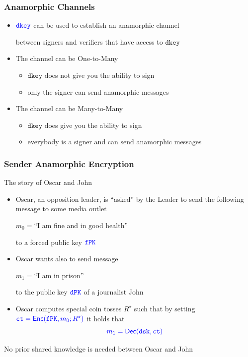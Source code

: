 \documentclass[]{beamer}
\newcommand{\algofont}[1]{{\mathsf{#1}}}
\newcommand{\objfont}[1]{{\mathtt{#1}}}
\newcommand{\enc}{\algofont{Enc}}
\newcommand{\dec}{\algofont{Dec}}
\newcommand{\ct}{\objfont{ct}}      %
\newcommand{\pk}{\objfont{PK}}      %
\newcommand{\fpk}{\objfont{f}\pk}   %
\newcommand{\dpk}{\objfont{d}\pk}   %
\newcommand{\sk}{\objfont{sk}}      %
\newcommand{\dsk}{\objfont{d}\sk}   %
\newcommand{\dkey}{\objfont{dkey}}  %
\begin{document}
\begin{frame}

\frametitle{Anamorphic Channels}

\begin{itemize}

\item $\color{blue} \dkey$ can be used to establish an {\color{purple} anamorphic channel}

    between signers and verifiers that have access to $\dkey$

\vfill

\item The channel can be \color{purple}  One-to-Many
        \begin{itemize}
            \item \color{brown} $\dkey$ does not give you the ability to sign
            \item \color{teal} only the signer can send anamorphic messages
        \end{itemize}

\vfill
\item \color{black}
The channel can be \color{purple}  Many-to-Many
        \begin{itemize}
            \item \color{brown} $\dkey$ does give you the ability to sign
            \item \color{teal} everybody is a signer and can send anamorphic
                messages
        \end{itemize}
\end{itemize}
\end{frame}


\begin{frame}
\frametitle{Sender Anamorphic Encryption}
\begin{block}{The story of Oscar and John}
\begin{itemize}[<+->]
\item {\color{green} Oscar}, an opposition leader, is ``asked'' by 
the Leader to send the following message to some media outlet

    \centerline{\color{purple} $m_0=$``I am fine and in good health''}

    to a {\color{purple} forced} public key $\color{blue} \fpk$

\item {\color{green} Oscar} wants also to send message 

\centerline{\color{purple} $m_1=$``I am in prison''}
 to the public key $\color{blue} \dpk$ of a journalist {\color{green} John} 
\item {\color{green} Oscar} computes special coin tosses $R^\star$ such that
by setting
    $\color{blue} \ct=\enc(\fpk,m_0;R^\star)$
it holds that 
$$\color{blue} m_1=\dec(\dsk,\ct)$$
\end{itemize}
\pause
{\color{red}
No prior shared knowledge is needed between {\color{green} Oscar} and {\color{green} John}
}
\end{block}
\end{frame}
\end{document}
